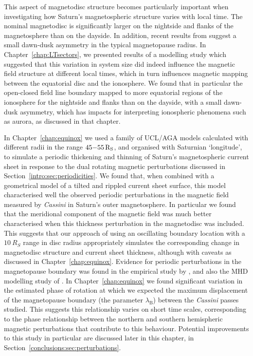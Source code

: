 This aspect of magnetodisc structure  becomes particularly important when investigating how Saturn's magnetospheric structure varies with local time. The nominal magnetodisc is significantly larger on the nightside and flanks of the magnetosphere than on the dayside. In addition, recent results from \citet{pilkington2015b} suggest a small dawn-dusk asymmetry in the typical magnetopause radius. In Chapter~\ref{chap:LTsectors}, we presented results of a modelling study which suggested that this variation in system size did indeed influence the magnetic field structure at different local times, which in turn influences magnetic mapping between the equatorial disc and the ionosphere. We found that in particular the open-closed field line boundary mapped to more equatorial regions of the ionosphere for the nightside and flanks than on the dayside, with a small dawn-dusk asymmetry, which has impacts for interpreting ionospheric phenomena such as aurora, as discussed in that chapter.

In Chapter~\ref{chap:equinox} we used a family of UCL/AGA models calculated with different radii in the range $45{\--}\SI{55}{R_S}$, and organised with Saturnian `longitude',  to simulate a periodic thickening and thinning of Saturn's magnetospheric current sheet in response to the dual rotating magnetic perturbations discussed in Section~\ref{intro:sec:periodicities}. We found that, when combined with a geometrical model of a tilted and rippled current sheet surface, this model characterised well the observed periodic perturbations in the magnetic field measured by \textit{Cassini} in Saturn's outer magnetosphere. In particular we found that the meridional component of  the magnetic field was much better characterised when this thickness perturbation in the magnetodisc was included. This suggests that our approach of using an oscillating boundary location with a $\SI{10}{R_S}$ range in disc radius appropriately simulates the corresponding change in magnetodisc structure and current sheet thickness, although with caveats as discussed in Chapter~\ref{chap:equinox}. Evidence for periodic perturbations in  the magnetopause boundary was found in the empirical study by \citet{clarke2010}, and also the MHD modelling study of \citet{kivelson2014}. In Chapter~\ref{chap:equinox} we found significant variation in the estimated phase of rotation at which we expected the maximum displacement of the magnetopause boundary (the parameter $\lambda_\mathrm{B}$) between the \textit{Cassini} passes studied. This suggests this relationship varies on short time scales, corresponding  to the phase relationship between the northern and southern hemispheric magnetic perturbations that contribute to this behaviour. Potential improvements to this study in particular are discussed later in this chapter, in Section~\ref{conclusions:sec:perturbations}.

